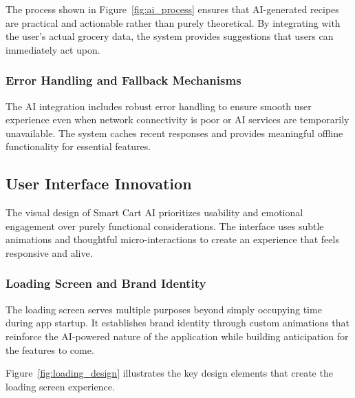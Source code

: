 \documentclass[11pt,a4paper]{article}
\begin{document}
The process shown in Figure~\ref{fig:ai_process} ensures that AI-generated recipes are practical and actionable rather than purely theoretical. By integrating with the user's actual grocery data, the system provides suggestions that users can immediately act upon.

\subsubsection{Error Handling and Fallback Mechanisms}

The AI integration includes robust error handling to ensure smooth user experience even when network connectivity is poor or AI services are temporarily unavailable. The system caches recent responses and provides meaningful offline functionality for essential features.

\subsection{User Interface Innovation}

The visual design of Smart Cart AI prioritizes usability and emotional engagement over purely functional considerations. The interface uses subtle animations and thoughtful micro-interactions to create an experience that feels responsive and alive.

\subsubsection{Loading Screen and Brand Identity}

The loading screen serves multiple purposes beyond simply occupying time during app startup. It establishes brand identity through custom animations that reinforce the AI-powered nature of the application while building anticipation for the features to come.

Figure~\ref{fig:loading_design} illustrates the key design elements that create the loading screen experience.
\end{document}
